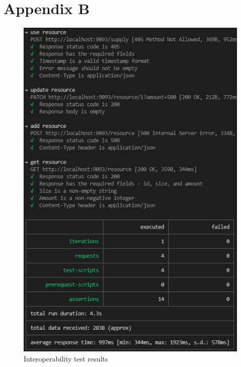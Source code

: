 \documentclass[conference]{IEEEtran}
\begin{document}
\section{Appendix B}

\begin{figure}[H]
    \centering
    \includegraphics[width=1\linewidth]{images/newman-test-report.png}
    \caption{Interoperability test results}
    \label{fig:interoperability-test}
\end{figure}

\vspace{12pt}
\end{document}
